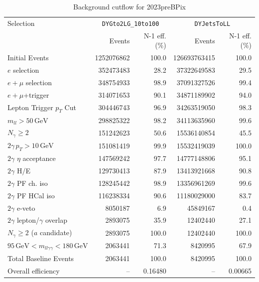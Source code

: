 \begin{table}[htbp]
\centering
\caption{Background cutflow for 2023preBPix}
\label{tab:cutflow-bkg-mc-2023prebpix}
\footnotesize
\begin{tabular}{lrrrr}
\hline
Selection & \multicolumn{2}{c}{\texttt{DYGto2LG\_10to100}} & \multicolumn{2}{c}{\texttt{DYJetsToLL}} \\
 & Events & N-1 eff. (\%) & Events & N-1 eff. (\%) \\
\hline
Initial Events & 1252076862 & 100.0 & 126693763415 & 100.0 \\
$e$ selection & 352473483 & 28.2 & 37322649583 & 29.5 \\
$e+\mu$ selection & 348754933 & 98.9 & 37091327526 & 99.4 \\
$e+\mu$+trigger & 314071653 & 90.1 & 34871189902 & 94.0 \\
Lepton Trigger $p_T$ Cut & 304446743 & 96.9 & 34263519050 & 98.3 \\
$m_{ll} > 50\,\mathrm{GeV}$ & 298825322 & 98.2 & 34113635960 & 99.6 \\
$N_{\gamma}\geq 2$ & 151242623 & 50.6 & 15536140854 & 45.5 \\
$2\gamma\,p_T > 10\,\mathrm{GeV}$ & 151081419 & 99.9 & 15532419039 & 100.0 \\
$2\gamma$ $\eta$ acceptance & 147569242 & 97.7 & 14777148806 & 95.1 \\
$2\gamma$ H/E & 129730413 & 87.9 & 13413921668 & 90.8 \\
$2\gamma$ PF ch. iso & 128245442 & 98.9 & 13356961269 & 99.6 \\
$2\gamma$ PF HCal iso & 116238334 & 90.6 & 11180029000 & 83.7 \\
$2\gamma$ e-veto & 8050187 & 6.9 & 45849167 & 0.4 \\
$2\gamma$ lepton/$\gamma$ overlap & 2893075 & 35.9 & 12402440 & 27.1 \\
$N_{\gamma}\geq 2$ ($a$ candidate) & 2893075 & 100.0 & 12402440 & 100.0 \\
$95\,\mathrm{GeV} < m_{ll\gamma\gamma} < 180\,\mathrm{GeV}$ & 2063441 & 71.3 & 8420995 & 67.9 \\
Total Baseline Events & 2063441 & 100.0 & 8420995 & 100.0 \\
\hline
Overall efficiency & -- & 0.16480 & -- & 0.00665 \\
\hline
\end{tabular}
\end{table}

